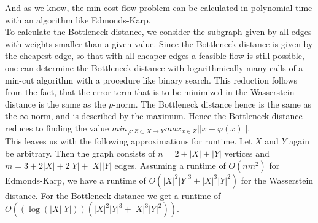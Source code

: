 \documentclass[11pt, a4paper,draft]{report}
\begin{document}
 	And as we know, the min-cost-flow problem can be calculated in polynomial time with an algorithm like Edmonds-Karp.\\
To calculate the Bottleneck distance, we consider the subgraph given by all edges with weights smaller than a given value. Since the Bottleneck distance is given by the cheapest edge, so that with all cheaper edges a feasible flow is still possible, one can determine the Bottleneck distance with logarithmically many calls of a min-cut algorithm with a procedure like binary search. This reduction follows from the fact, that the error term that is to be minimized in the Wasserstein distance is the same as the $p$-norm. The Bottleneck distance hence is the same as the $\infty$-norm, and is described by the maximum. Hence the Bottleneck distance reduces to finding the value $min_{\varphi:Z\subset X \rightarrow Y} max_{x\in Z}||x - \varphi(x)||$.\\
	This leaves us with the following approximations for runtime. Let $X$ and $Y$ again be arbitrary. Then the graph consists of $n=2+|X|+|Y|$ vertices and $m=3+2|X|+2|Y|+|X||Y|$ edges. Assuming a runtime of $O(nm^2)$ for Edmonds-Karp, we have a runtime of $O(|X|^2|Y|^3 + |X|^3|Y|^2)$ for the Wasserstein distance. For the Bottleneck distance we get a runtime of $O((\log(|X||Y|))(|X|^2|Y|^3 + |X|^3|Y|^2))$.
\end{document}
